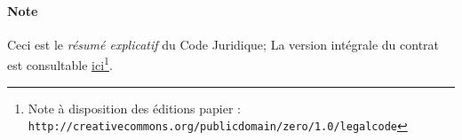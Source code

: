 \paragraph{Note}

  Ceci est le \emph{résumé explicatif} du Code Juridique; 
  La version intégrale du contrat est consultable 
  \href{http://creativecommons.org/publicdomain/zero/1.0/legalcode}{ici}\footnote{Note à disposition des éditions papier : \texttt{http://creativecommons.org/publicdomain/zero/1.0/legalcode}}.


